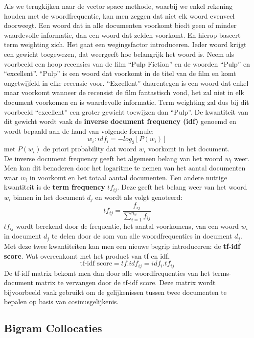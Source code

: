 Als we terugkijken naar de vector space methode, waarbij we enkel rekening houden met de woordfrequentie, kan men zeggen dat niet elk woord evenveel doorweegt. Een woord dat in alle documenten voorkomt biedt geen of minder waardevolle informatie, dan een woord dat zelden voorkomt. En hierop baseert term weighting zich. Het gaat een wegingsfactor introduceren. Ieder woord krijgt een gewicht toegewezen, dat weergeeft hoe belangrijk het woord is. Neem als voorbeeld een hoop recensies van de film ``Pulp Fiction'' en de woorden ``Pulp'' en ``excellent''. ``Pulp'' is een woord dat voorkomt in de titel van de film en komt ongetwijfeld in elke recensie voor. ``Excellent'' daarentegen is een woord dat enkel maar voorkomt wanneer de recensist de film fantastisch vond, het zal niet in elk document voorkomen en is waardevolle informatie. Term weighting zal dus bij dit voorbeeld ``excellent'' een groter gewicht toewijzen dan ``Pulp''. 
%
De kwantiteit van dit gewicht wordt vaak de \textbf{inverse document frequency  (idf)} genoemd en wordt bepaald aan de hand van volgende formule:
\[w_{i}: idf_{i} = -log_{2}[P(w_{i})] \]
met $P(w_{i})$ de priori probability dat woord $w_{i}$ voorkomt in het document.\\
%
De inverse document frequency geeft het algemeen belang van het woord $w_{i}$ weer. Men kan dit benaderen door het logaritme te nemen van het aantal documenten waar $w_{i}$ in voorkomt en het totaal aantal documenten.
Een andere nuttige kwantiteit is de  \textbf{term frequency} $tf_{ij}$. Deze geeft het belang weer van het woord $w_{i}$ binnen in het document $d_{j}$  en wordt als volgt genoteerd:
\[ tf_{ij} = \frac{f_{ij}}{ \sum_{i=1}^{n_{w}}f_{ij}} \]
%
$tf_{ij}$ wordt berekend door de frequentie, het aantal voorkomens, van een woord $w_{i}$ in document $d_{j}$ te delen door de som van alle woordfrequenties in document $d_{j}$.
Met deze twee kwantiteiten kan men een nieuwe begrip introduceren: de \textbf{tf-idf score}. Wat overeenkomt met het product van tf en idf.
\[ \text{tf-idf score} = tf . idf_{ij} = idf_{i} . tf_{ij} \]
%
De tf-idf matrix bekomt men dan door alle woordfrequenties van het terms-document matrix te vervangen door de tf-idf score.
Deze matrix wordt bijvoorbeeld vaak gebruikt om de gelijkenissen tussen twee documenten te bepalen op basis van cosinusgelijkenis.


\subsection{Bigram Collocaties}\label{Bigram Collocaties}

